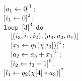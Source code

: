 \begin{figure} 
\centering
   \begin{subfigure}{.2\textwidth}
   \begin{centering}
   $
   \begin{array}{l}
  \clabel{ a_1 \leftarrow 0}^{1}; \\
   \clabel{ i_1 \leftarrow 0}^{2} ; \\
    \eloop ~ \clabel{3}^{3} ~ \edo ~ \\ 
    \quad [(i_3, i_1,i_2), (a_3,a_2,a_1)] \\
    \quad
    \clabel{ x_1 \leftarrow q_1(\chi[i_3])}^{4}   ; \\
    \quad \clabel{a_2 \leftarrow a_3+x_1}^{5}; \\
        \quad \clabel{i_2 \leftarrow i_3+1}^{6}; \\
    \clabel{l_1 \leftarrow q_2(\chi[4]*a_3)}^{7}\\
    \end{array}
 $
 \caption{}
   \end{centering}
   \end{subfigure}
   \begin{subfigure}{.5\textwidth}
   \begin{centering}
   $\vcenter{\hbox{
   \begin{tikzpicture}[scale=\textwidth/18cm,samples=200]

\end{tikzpicture}}}
\end{centering}
\end{subfigure}
\end{figure}
